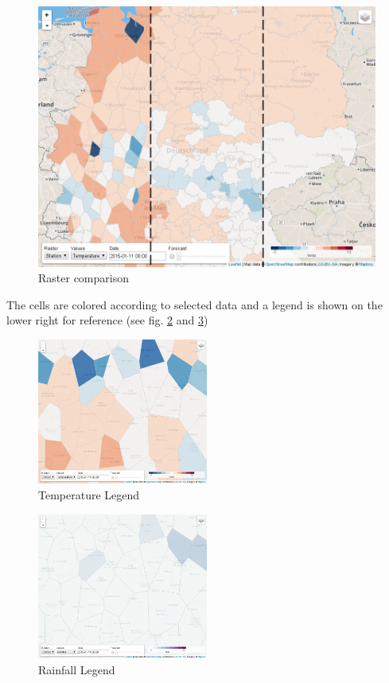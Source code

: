 \documentclass[paper=a4, fontsize=11pt]{scrartcl} %
\numberwithin{equation}{section} %
\numberwithin{figure}{section} %
\numberwithin{table}{section} %
\begin{document}
\begin{figure}[htbp]
\centering
\includegraphics[width=1\textwidth]{pictures/screenshot-raster.png}
\caption{Raster comparison}
\label{fig:raster-comparison}
\end{figure}

The cells are colored according to selected data and a legend is shown
on the lower right for reference (see fig. \ref{fig:temperature-legend} and \ref{fig:rainfall-legend})

\begin{figure}[htbp]
\centering
\includegraphics[width=0.5\textwidth]{pictures/screenshot-legend-temp.png}
\caption{Temperature Legend}
\label{fig:temperature-legend}
\end{figure}

\begin{figure}[htbp]
\centering
\includegraphics[width=0.5\textwidth]{pictures/screenshot-legend-rain.png}
\caption{Rainfall Legend}
\label{fig:rainfall-legend}
\end{figure}
\end{document}
